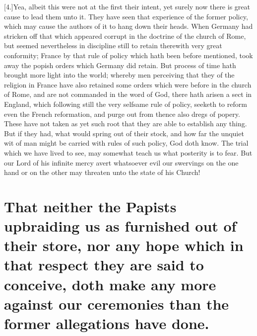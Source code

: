[4.]Yea, albeit this were not at the first their intent, yet surely now there is great cause to lead them unto it. They have seen that experience of the former policy, which may cause the authors of it to hang down their heads. When Germany had stricken off that which appeared corrupt in the doctrine of the church of Rome, but seemed nevertheless in discipline still to retain therewith very great conformity; France by that rule of policy which hath been before mentioned, took away the popish orders which Germany did retain. But process of time hath brought more light into the world; whereby men perceiving that they of the religion in France have also retained some orders which were before  in the church of Rome, and are not commanded in the word of God, there hath arisen a sect in England, which following still the very selfsame rule of policy, seeketh to reform even the French reformation, and purge out from thence also dregs of popery. These have not taken as yet such root that they are able to establish any thing. But if they had, what would spring out of their stock, and how far the unquiet wit of man might be carried with rules of such policy, God doth know. The trial which we have lived to see, may somewhat teach us what posterity is to fear. But our Lord of his infinite mercy avert whatsoever evil our swervings on the one hand or on the other may threaten unto the state of his Church!

\section*{That neither the Papists upbraiding us as furnished out of their store, nor any hope which in that respect they are said to conceive, doth make any more against our ceremonies than the former allegations have done.}

